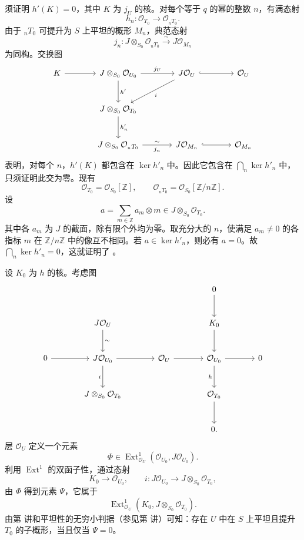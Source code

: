 须证明 \(h'(K)=0\)，其中 \(K\) 为 \(j_U\) 的核。对每个等于 \(q\) 的幂的整数 \(n\)，有满态射
\[
  h_n:\mathcal O_{T_0}\longrightarrow\mathcal O_{{}_nT_0}.
\]
由于 \({}_nT_0\) 可提升为 \(S\) 上平坦的概形 \(M_n\)，典范态射
\[
  j_n:J\otimes_{S_0}\mathcal O_{{}_nT_0}
  \xrightarrow{\sim}J\mathcal O_{M_n}
\]
为同构。交换图
\[
\begin{tikzcd}[column sep=large,row sep=large]
K \arrow[r]
  & J\otimes_{S_0}\mathcal O_{U_0}
      \arrow[r,"j_U"] \arrow[d,"h'"]
  & J\mathcal O_U \arrow[r,hook] \arrow[dl,"i"]
  & \mathcal O_U \\
  & J\otimes_{S_0}\mathcal O_{T_0}
      \arrow[d,"h'_n"] & & \\
  & J\otimes_{S_0}\mathcal O_{{}_nT_0}
      \arrow[r,"j_n"',"\sim"] & J\mathcal O_{M_n}
      \arrow[r,hook] & \mathcal O_{M_n}
\end{tikzcd}
\]
表明，对每个 \(n\)，\(h'(K)\) 都包含在 \(\ker h'_n\) 中。因此它包含在 \(\bigcap_n\ker h'_n\) 中，只须证明此交为零。现有
\[
  \mathcal O_{T_0}=\mathcal O_{S_0}[\mathbb Z],
  \qquad
  \mathcal O_{{}_nT_0}
     =\mathcal O_{S_0}[\mathbb Z/n\mathbb Z].
\]
设
\[
  a=\sum_{m\in\mathbb Z}a_m\otimes m
  \in J\otimes_{S_0}\mathcal O_{T_0}.
\]
其中各 \(a_m\) 为 \(J\) 的截面，除有限个外均为零。取充分大的 \(n\)，使满足 \(a_m\ne0\) 的各指标 \(m\) 在 \(\mathbb Z/n\mathbb Z\) 中的像互不相同。若 \(a\in\ker h'_n\)，则必有 \(a=0\)。故 \(\bigcap_n\ker h'_n=0\)，这就证明了 。

设 \(K_0\) 为 \(h\) 的核。考虑图
\[
\begin{tikzcd}[column sep=large,row sep=large]
  &&& 0 \arrow[d] \\
  & J\mathcal O_U \arrow[d,"\sim"] && K_0 \arrow[d] \\
0 \arrow[r]
  & J\mathcal O_{U_0} \arrow[r] \arrow[d,"i"']
  & \mathcal O_U \arrow[r] & \mathcal O_{U_0}
      \arrow[r] \arrow[d,"h"'] & 0 \\
  & J\otimes_{S_0}\mathcal O_{T_0}
  && \mathcal O_{T_0} \arrow[d] \\
  &&& 0 .
\end{tikzcd}
\]
层 \(\mathcal O_U\) 定义一个元素
\[
  \Phi\in
  \operatorname{Ext}^{1}_{\mathcal O_U}
  (\mathcal O_{U_0},J\mathcal O_{U_0}).
\]
利用 \(\operatorname{Ext}^{1}\) 的双函子性，通过态射
\[
  K_0\longrightarrow\mathcal O_{U_0},
  \qquad
  i:J\mathcal O_{U_0}
    \longrightarrow J\otimes_{S_0}\mathcal O_{T_0},
\]
由 \(\Phi\) 得到元素 \(\Psi\)，它属于
\[
  \operatorname{Ext}^{1}_{\mathcal O_U}
  (K_0,J\otimes_{S_0}\mathcal O_{T_0}).
\]
由第  讲和平坦性的无穷小判据（参见第  讲）可知：存在 \(U\) 中在 \(S\) 上平坦且提升 \(T_0\) 的子概形，当且仅当 \(\Psi=0\)。

